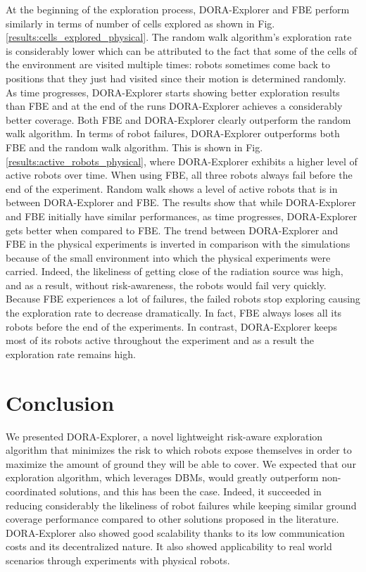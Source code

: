 At the beginning of the exploration process, DORA-Explorer and FBE perform
similarly in terms of number of cells explored as shown in
Fig. \ref{results:cells_explored_physical}. The random walk
algorithm's exploration rate is considerably lower which can be
attributed to the fact that some of the cells of the environment are
visited multiple times: robots sometimes come back to positions that
they just had visited since their motion is determined randomly. As
time progresses, DORA-Explorer starts showing better exploration results than
FBE and at the end of the runs DORA-Explorer achieves a considerably better
coverage. Both FBE and DORA-Explorer clearly outperform the random walk
algorithm. In terms of robot failures, DORA-Explorer outperforms both FBE and the random
walk algorithm. This is shown in
Fig. \ref{results:active_robots_physical}, where DORA-Explorer exhibits a
higher level of active robots over time. When using FBE, all three
robots always fail before the end of the experiment. Random walk
shows a level of active robots that is in between DORA-Explorer and FBE. The results show that while DORA-Explorer and FBE initially have similar performances, as time progresses,
DORA-Explorer gets better when compared to FBE. The trend between DORA-Explorer and FBE in the physical experiments is inverted in comparison with the simulations because of the small environment into which the physical experiments were carried. Indeed, the likeliness of getting close of the radiation source was high, and as a result, without risk-awareness, the robots would fail very quickly. Because FBE
experiences a lot of failures, the failed robots stop exploring causing the exploration rate to decrease dramatically. In fact, FBE
always loses all its robots before the end of the experiments. In contrast,
DORA-Explorer keeps most of its robots active throughout the experiment and as a result the exploration rate remains high.


\section{Conclusion}
We presented DORA-Explorer, a novel lightweight risk-aware exploration
algorithm that minimizes the risk to which robots expose themselves in
order to maximize the amount of ground they will be able to cover. We expected that our exploration algorithm, which
leverages DBMs, would greatly outperform non-coordinated solutions,
and this has been the case. Indeed, it succeeded in reducing
considerably the likeliness of robot failures while keeping similar
ground coverage performance compared to other solutions proposed in
the literature. DORA-Explorer also showed good scalability thanks to its low
communication costs and its decentralized nature. It also showed applicability to real world
scenarios through experiments with physical robots. 


